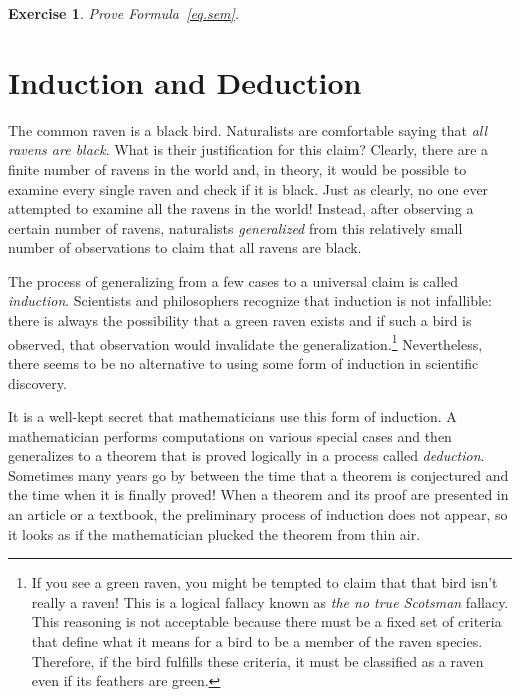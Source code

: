 \documentclass[11pt,a4paper]{report}
\newtheorem{exercise}{Exercise}
\begin{document}
\begin{exercise}
Prove Formula~\ref{eq.sem}.
\end{exercise}


\chapter{Induction and Deduction}\label{s.ind-ded}

The common raven is a black bird. Naturalists are comfortable saying that \emph{all ravens are black}. What is their justification for this claim? Clearly, there are a finite number of ravens in the world and, in theory, it would be possible to examine every single raven and check if it is black. Just as clearly, no one ever attempted to examine all the ravens in the world! Instead, after observing a certain number of ravens, naturalists \emph{generalized} from this relatively small number of observations to claim that all ravens are black.

The process of generalizing from a few cases to a universal claim is called \emph{induction}. Scientists and philosophers recognize that induction is not infallible: there is always the possibility that a green raven exists and if such a bird is observed, that observation would invalidate the generalization.\footnote{If you see a green raven, you might be tempted to claim that that bird isn't really a raven! This is a logical fallacy known as \emph{the no true Scotsman} fallacy. This reasoning is not acceptable because there must be a fixed set of criteria that define what it means for a bird to be a member of the raven species. Therefore, if the bird fulfills these criteria, it must be classified as a raven even if its feathers are green.} Nevertheless, there seems to be no alternative to using some form of induction in scientific discovery.

It is a well-kept secret that mathematicians use this form of induction. A mathematician performs computations on various special cases and then generalizes to a theorem that is proved logically in a process called \emph{deduction}. Sometimes many years go by between the time that a theorem is conjectured and the time when it is finally proved! When a theorem and its proof are presented in an article or a textbook, the preliminary process of induction does not appear, so it looks as if the mathematician plucked the theorem from thin air.
\end{document}
